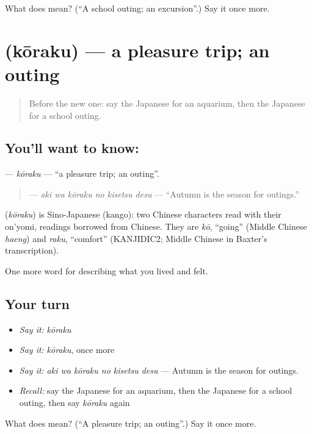 \begin{tcolorbox}[breakable,colback=teal!4,colframe=teal!35!black,title={Before you move on}]
What does  mean? (\textquotedblleft{}A school outing; an excursion\textquotedblright{}.) Say it once more.
\end{tcolorbox}
\section[\texorpdfstring{\ja{こうらく} (kōraku)}{こうらく (kōraku)}]{ (kōraku) — a pleasure trip; an outing}

\label{lesson:JA-C499-kouraku}



\begin{quote}
Before the new one: say the Japanese for an aquarium, then the Japanese for a school outing.
\end{quote}

\subsection*{You'll want to know: }
\textbf{} — \emph{kōraku} — \textquotedblleft{}a pleasure trip; an outing\textquotedblright{}.

\begin{quote}
\textbf{  } — \emph{aki wa kōraku no kisetsu desu} — \textquotedblleft{}Autumn is the season for outings.\textquotedblright{}
\end{quote}

\begin{cousinweb}
\textbf{} (\emph{kōraku}) is Sino-Japanese (kango): two Chinese characters read with their on'yomi, readings borrowed from Chinese. They are \emph{kō}, \textquotedblleft{}going\textquotedblright{} (Middle Chinese \emph{haeng}) and \emph{raku}, \textquotedblleft{}comfort\textquotedblright{} (KANJIDIC2; Middle Chinese in Baxter's transcription).
\end{cousinweb}

\begin{grammarlens}[title={What you've built}]
One more word for describing what you lived and felt.
\end{grammarlens}

\subsection*{Your turn}
\begin{itemize}
\raggedright
  \item \emph{Say it:} \emph{kōraku}
  \item \emph{Say it:} \emph{kōraku}, once more
  \item \emph{Say it:} \emph{aki wa kōraku no kisetsu desu} — Autumn is the season for outings.
  \item \emph{Recall:} say the Japanese for an aquarium, then the Japanese for a school outing, then say \emph{kōraku} again
\end{itemize}

\begin{tcolorbox}[breakable,colback=teal!4,colframe=teal!35!black,title={Before you move on}]
What does  mean? (\textquotedblleft{}A pleasure trip; an outing\textquotedblright{}.) Say it once more.
\end{tcolorbox}
